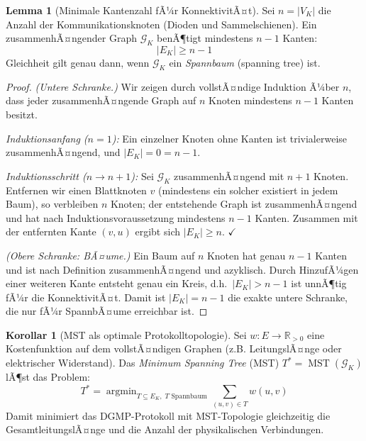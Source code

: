 ﻿\documentclass[a4paper,12pt]{article}
\theoremstyle{definition}
\newtheorem{lemma}[definition]{Lemma}
\newtheorem{korollar}[definition]{Korollar}
\theoremstyle{remark}
\newcommand{\R}{\mathbb{R}}
\begin{document}
\begin{lemma}[Minimale Kantenzahl fÃ¼r KonnektivitÃ¤t]
\label{lem:komm_mst}
Sei $n = |V_K|$ die Anzahl der Kommunikationsknoten (Dioden und Sammelschienen).
Ein zusammenhÃ¤ngender Graph $\mathcal{G}_K$ benÃ¶tigt mindestens $n-1$ Kanten:
\begin{equation}
  |E_K| \geq n - 1
  \label{eq:kantenmin}
\end{equation}
Gleichheit gilt genau dann, wenn $\mathcal{G}_K$ ein \emph{Spannbaum} (spanning tree) ist.
\end{lemma}

\begin{proof}
\emph{(Untere Schranke.)} Wir zeigen durch vollstÃ¤ndige Induktion Ã¼ber $n$,
dass jeder zusammenhÃ¤ngende Graph auf $n$ Knoten mindestens $n-1$ Kanten besitzt.

\emph{Induktionsanfang ($n=1$):} Ein einzelner Knoten ohne Kanten ist
trivialerweise zusammenhÃ¤ngend, und $|E_K| = 0 = n - 1$.

\emph{Induktionsschritt ($n \to n+1$):} Sei $\mathcal{G}_K$ zusammenhÃ¤ngend mit
$n+1$ Knoten. Entfernen wir einen Blattknoten $v$ (mindestens ein solcher existiert
in jedem Baum), so verbleiben $n$ Knoten; der entstehende Graph ist zusammenhÃ¤ngend
und hat nach Induktionsvoraussetzung mindestens $n-1$ Kanten. Zusammen mit der
entfernten Kante $(v, u)$ ergibt sich $|E_K| \geq n$. $\checkmark$

\emph{(Obere Schranke: BÃ¤ume.)} Ein Baum auf $n$ Knoten hat genau $n-1$ Kanten
und ist nach Definition zusammenhÃ¤ngend und azyklisch. Durch HinzufÃ¼gen einer
weiteren Kante entsteht genau ein Kreis, d.h.~$|E_K| > n-1$ ist unnÃ¶tig fÃ¼r
die KonnektivitÃ¤t. Damit ist $|E_K| = n-1$ die exakte untere Schranke, die nur
fÃ¼r SpannbÃ¤ume erreichbar ist. \qedhere
\end{proof}

\begin{korollar}[MST als optimale Protokolltopologie]
\label{kor:mst_opt}
Sei $w: E \to \R_{>0}$ eine Kostenfunktion auf dem vollstÃ¤ndigen Graphen
(z.B. LeitungslÃ¤nge oder elektrischer Widerstand). Das
\emph{Minimum Spanning Tree} (MST) $T^* = \operatorname{MST}(\mathcal{G}_K)$
lÃ¶st das Problem:
\begin{equation}
  T^* = \operatorname{argmin}_{T \subseteq E_K,\; T \text{ Spannbaum}}
        \sum_{(u,v) \in T} w(u,v)
  \label{eq:mst_problem}
\end{equation}
Damit minimiert das DGMP-Protokoll mit MST-Topologie gleichzeitig die
GesamtleitungslÃ¤nge und die Anzahl der physikalischen Verbindungen.
\end{korollar}
\end{document}
